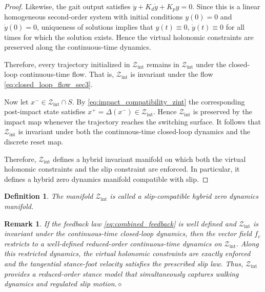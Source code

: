\documentclass[letterpaper, 10 pt, conference]{ieeeconf}
\newtheorem{definition}{Definition}
\newtheorem{remark}{Remark}
\newtheorem{proposition}{Proposition}
\begin{document}
{\begin{proof}
Likewise, the gait output satisfies $\ddot y+K_d\dot y+K_p y=0$. Since this is a linear homogeneous second-order system with initial conditions $y(0)=0$ and $\dot y(0)=0$, uniqueness of solutions implies that $y(t)\equiv 0,\, \dot y(t)\equiv 0$ for all times for which the solution exists. Hence the virtual holonomic constraints are preserved along the continuous-time dynamics.

Therefore, every trajectory initialized in $\mathcal Z_{\mathrm{int}}$ remains in $\mathcal Z_{\mathrm{int}}$ under the closed-loop continuous-time flow. That is, $\mathcal Z_{\mathrm{int}}$ is invariant under the flow \eqref{eq:closed_loop_flow_sec3}.

Now let $x^-\in \mathcal Z_{\mathrm{int}}\cap S$. By \eqref{eq:impact_compatibility_zint} the corresponding post-impact state satisfies $x^+=\Delta(x^-)\in \mathcal Z_{\mathrm{int}}$. Hence $\mathcal Z_{\mathrm{int}}$ is preserved by the impact map whenever the trajectory reaches the switching surface. It follows that $\mathcal Z_{\mathrm{int}}$ is invariant under both the continuous-time closed-loop dynamics and the discrete reset map. 

Therefore, $\mathcal Z_{\mathrm{int}}$ defines a hybrid invariant manifold on which both the virtual holonomic constraints and the slip constraint are enforced. In particular, it defines a hybrid zero dynamics manifold compatible with slip.
\end{proof}

\begin{definition}
The manifold $\mathcal Z_{\mathrm{int}}$ is called a \emph{slip-compatible hybrid zero dynamics manifold}.
\end{definition}

\begin{remark}
If the feedback law \eqref{eq:combined_feedback} is well defined and $\mathcal Z_{\mathrm{int}}$ is invariant under the continuous-time closed-loop dynamics, then the vector field $f_c$ restricts to a well-defined reduced-order continuous-time dynamics on $\mathcal Z_{\mathrm{int}}$. Along this restricted dynamics, the virtual holonomic constraints are exactly enforced and the tangential stance-foot velocity satisfies the prescribed slip law. Thus, $\mathcal Z_{\mathrm{int}}$ provides a reduced-order stance model that simultaneously captures walking dynamics and regulated slip motion.\hfill$\diamond$
\end{remark}


}
\end{document}
